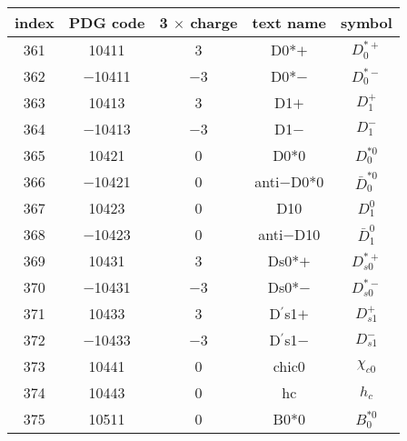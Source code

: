 \documentclass{article}
\begin{document}
\begin{table}[!htbp]
\centering
\begin{tabular}{|c|c|c|c|c|}
\hline
index & PDG code & 3 $\times$ charge & text name & symbol \\
\hline
361 & 10411 & 3 & D\underline{\hspace{0.6em}}0*$+$ & $D_{0}^{*+}$ \\
\hline
362 & $-$10411 & $-$3 & D\underline{\hspace{0.6em}}0*$-$ & $D_{0}^{*-}$ \\
\hline
363 & 10413 & 3 & D\underline{\hspace{0.6em}}1$+$ & $D_{1}^{+}$ \\
\hline
364 & $-$10413 & $-$3 & D\underline{\hspace{0.6em}}1$-$ & $D_{1}^{-}$ \\
\hline
365 & 10421 & 0 & D\underline{\hspace{0.6em}}0*0 & $D_{0}^{*0}$ \\
\hline
366 & $-$10421 & 0 & anti$-$D\underline{\hspace{0.6em}}0*0 & $\bar{D}_{0}^{*0}$ \\
\hline
367 & 10423 & 0 & D\underline{\hspace{0.6em}}10 & $D_{1}^{0}$ \\
\hline
368 & $-$10423 & 0 & anti$-$D\underline{\hspace{0.6em}}10 & $\bar{D}_{1}^{0}$ \\
\hline
369 & 10431 & 3 & D\underline{\hspace{0.6em}}s0*$+$ & $D_{s0}^{*+}$ \\
\hline
370 & $-$10431 & $-$3 & D\underline{\hspace{0.6em}}s0*$-$ & $D_{s0}^{*-}$ \\
\hline
371 & 10433 & 3 & D$^{\prime}$\underline{\hspace{0.6em}}s1$+$ & $D_{s1}^{+}$ \\
\hline
372 & $-$10433 & $-$3 & D$^{\prime}$\underline{\hspace{0.6em}}s1$-$ & $D_{s1}^{-}$ \\
\hline
373 & 10441 & 0 & chi\underline{\hspace{0.6em}}c0 & $\chi_{c0}$ \\
\hline
374 & 10443 & 0 & h\underline{\hspace{0.6em}}c & $h_{c}$ \\
\hline
375 & 10511 & 0 & B\underline{\hspace{0.6em}}0*0 & $B_{0}^{*0}$ \\

\end{tabular}
\end{table}
\end{document}

